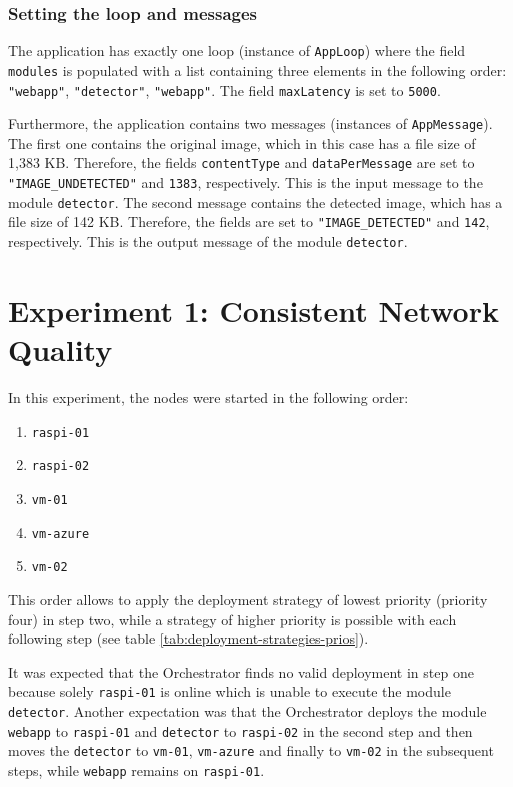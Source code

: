 \subsubsection*{Setting the loop and messages}
The application has exactly one loop (instance of \texttt{AppLoop}) where the field \texttt{modules} is populated with a list containing three elements in the following order:
\texttt{"webapp"}, \texttt{"detector"}, \texttt{"webapp"}.
The field \texttt{maxLatency} is set to \texttt{5000}.

Furthermore, the application contains two messages (instances of \texttt{AppMessage}).
The first one contains the original image, which in this case has a file size of 1,383 KB. Therefore, the fields \texttt{contentType} and \texttt{dataPerMessage} are set to \texttt{"IMAGE\_UNDETECTED"} and  \texttt{1383}, respectively. This is the input message to the module \texttt{detector}.
The second message contains the detected image, which has a file size of 142 KB. Therefore, the fields are set to \texttt{"IMAGE\_DETECTED"} and \texttt{142}, respectively. This is the output message of the module \texttt{detector}.









\section{Experiment 1: Consistent Network Quality\label{sec:eval-exp-1}}

In this experiment, the nodes were started in the following order:
\begin{enumerate}
    \item \texttt{raspi-01}
    \item \texttt{raspi-02}
    \item \texttt{vm-01}
    \item \texttt{vm-azure}
    \item \texttt{vm-02}
\end{enumerate}
This order allows to apply the deployment strategy of lowest priority (priority four) in step two, while a strategy of higher priority is possible with each following step (see table \ref{tab:deployment-strategies-prios}).

It was expected that the Orchestrator finds no valid deployment in step one because solely \texttt{raspi-01} is online which is unable to execute the module \texttt{detector}.
Another expectation was that the Orchestrator deploys the module \texttt{webapp} to \texttt{raspi-01} and \texttt{detector} to \texttt{raspi-02} in the second step and then moves the \texttt{detector} to \texttt{vm-01}, \texttt{vm-azure} and finally to \texttt{vm-02} in the subsequent steps, while \texttt{webapp} remains on \texttt{raspi-01}.

